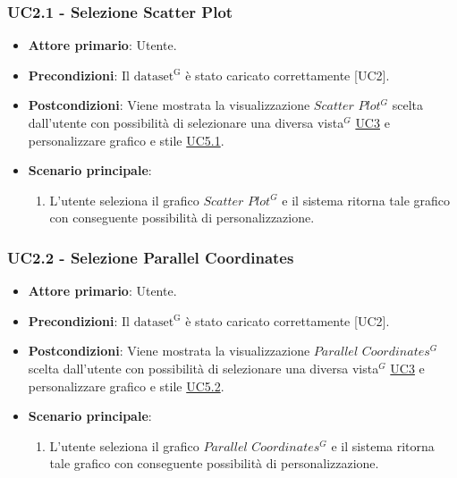 \subsubsection{UC2.1 - Selezione Scatter Plot}
\label{sec:UC2.1}
\begin{itemize}
    \item \textbf{Attore primario}: Utente.
    \item \textbf{Precondizioni}: Il ${\mathrm{dataset^{G}}}$ è stato caricato correttamente [UC2].
    \item \textbf{Postcondizioni}: Viene mostrata la visualizzazione $Scatter$ $Plot^{G}$ scelta dall'utente con possibilità di selezionare una diversa vista$^{G}$ \hyperref[sec:UC3]{UC3} e personalizzare grafico e stile \hyperref[sec:UC5.1]{UC5.1}. %
    \item \textbf{Scenario principale}:
          \begin{enumerate}
              \item L'utente seleziona il grafico $Scatter$ $Plot^{G}$ e il sistema ritorna tale grafico con conseguente possibilità di personalizzazione. 
          \end{enumerate}
\end{itemize}

\subsubsection{UC2.2 - Selezione Parallel Coordinates}
\label{sec:UC2.2}
\begin{itemize}
    \item \textbf{Attore primario}: Utente.
    \item \textbf{Precondizioni}: Il ${\mathrm{dataset^{G}}}$ è stato caricato correttamente [UC2].
    \item \textbf{Postcondizioni}: Viene mostrata la visualizzazione $Parallel$ $Coordinates^{G}$ scelta dall'utente con possibilità di selezionare una diversa vista$^{G}$ \hyperref[sec:UC3]{UC3} e personalizzare grafico e stile \hyperref[sec:UC5.2]{UC5.2}. %
    \item \textbf{Scenario principale}:
          \begin{enumerate}
              \item L'utente seleziona il grafico $Parallel$ $Coordinates^{G}$ e il sistema ritorna tale grafico con conseguente possibilità di personalizzazione. 
          \end{enumerate}
\end{itemize}

